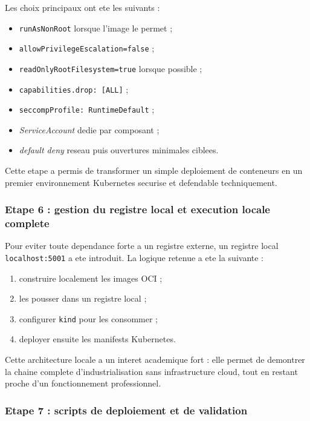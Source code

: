 Les choix principaux ont ete les suivants :

\begin{itemize}
  \item \texttt{runAsNonRoot} lorsque l'image le permet ;
  \item \texttt{allowPrivilegeEscalation=false} ;
  \item \texttt{readOnlyRootFilesystem=true} lorsque possible ;
  \item \texttt{capabilities.drop: [ALL]} ;
  \item \texttt{seccompProfile: RuntimeDefault} ;
  \item \textit{ServiceAccount} dedie par composant ;
  \item \textit{default deny} reseau puis ouvertures minimales ciblees.
\end{itemize}

Cette etape a permis de transformer un simple deploiement de conteneurs en un premier environnement Kubernetes securise et defendable techniquement.

\subsubsection{Etape 6 : gestion du registre local et execution locale complete}

Pour eviter toute dependance forte a un registre externe, un registre local \texttt{localhost:5001} a ete introduit. La logique retenue a ete la suivante :

\begin{enumerate}
  \item construire localement les images OCI ;
  \item les pousser dans un registre local ;
  \item configurer \texttt{kind} pour les consommer ;
  \item deployer ensuite les manifests Kubernetes.
\end{enumerate}

Cette architecture locale a un interet academique fort : elle permet de demontrer la chaine complete d'industrialisation sans infrastructure cloud, tout en restant proche d'un fonctionnement professionnel.

\subsubsection{Etape 7 : scripts de deploiement et de validation}

